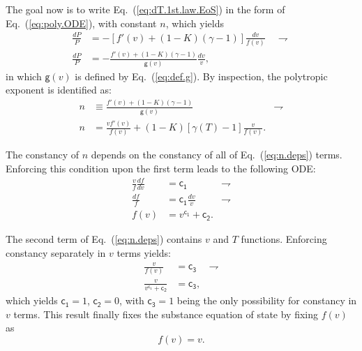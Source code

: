 \documentclass[fleqn,11pt]{SelfArx}
\begin{document}
    The   goal   now   is   to   write   Eq.~(\ref{eq:dT.1st.law.EoS})   in    the    form    of
    Eq.~(\ref{eq:poly.ODE}), with constant $n$, which yields
    \begin{align}
        \frac{dP}{P} & = - [f'(v) + (1 - K)(\gamma - 1)]\frac{dv}{f(v)}\quad\rightharpoondown\\
        \frac{dP}{P} & = -\frac{f'(v) + (1 - K)(\gamma - 1)}{\mathsf{g}(v)}\frac{dv}{v},
        \label{eq:Pv.ODE}
    \end{align}
    \noindent in which $\mathsf{g}(v)$ is defined by Eq.~(\ref{eq:def.g}).  By  inspection,  the
    polytropic exponent is identified as:
    \begin{align}
        n & \equiv \frac{f'(v) + (1 - K)(\gamma - 1)}{\mathsf{g}(v)} & \rightharpoondown
        \label{eq:n} \\
        n & = \frac{vf'(v)}{f(v)} + (1 - K)[\gamma(T) - 1]\frac{v}{f(v)}.
        \label{eq:n.deps}
    \end{align}

    The constancy of $n$ depends  on  the  constancy  of  all  of  Eq.~(\ref{eq:n.deps})  terms.
    Enforcing this condition upon the first term leads to the following ODE:
    \begin{align}
        \frac{v}{f}\frac{df}{dv} & = \mathsf{c_1} & \rightharpoondown \\
        \frac{df}{f} & = \mathsf{c_1}\frac{dv}{v} & \rightharpoondown \\
        f(v) & = v^{\mathsf{c_1}} + \mathsf{c_2}.
        \label{eq:f.two.consts}
    \end{align}

    The second term of Eq.~(\ref{eq:n.deps}) contains $v$ and $T$ functions. Enforcing constancy
    separately in $v$ terms yields:
    \begin{align}
        \frac{v}{f(v)} & = \mathsf{c_3} & \rightharpoondown \\
        \frac{v}{v^{\mathsf{c_1}} + \mathsf{c_2}} & = \mathsf{c_3},
        \label{eq:f.three.consts}
    \end{align}
    \noindent which yields $\mathsf{c_1} = 1$, $\mathsf{c_2} = 0$, with $\mathsf{c_3} = 1$ being
    the only possibility for constancy in $v$ terms. This result  finally  fixes  the  substance
    equation of state by fixing $f(v)$ as
    \begin{equation}
        f(v) = v.
        \label{eq:f}
    \end{equation}
\end{document}
